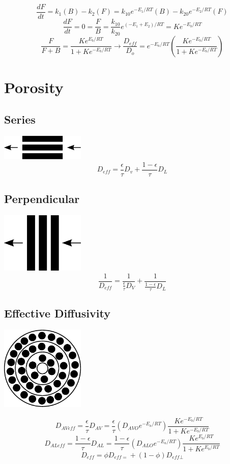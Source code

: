 \documentclass[11pt]{article}
\begin{document}
\[ \frac{dF}{dt} = k_1(B) - k_2(F) = k_{10} e^{-E_1/RT}(B) - k_{20} e^{-E_2/RT}(F) \]
\[ \frac{dF}{dt} = 0 = \frac{F}{B} = \frac{k_{10}}{k_{20}} e^{(-E_1 + E_2)/RT} = Ke^{-E_b/RT} \]
\[ \frac{F}{F+B} = \frac{Ke^{E_b/RT}}{1+Ke^{-E_b/RT}} \rightarrow
\frac{D_{eff}}{D_o} = e^{-E_a/RT}\left(\frac{Ke^{-E_b/RT}}{1+Ke^{-E_b/RT}}\right) \]

\section{Porosity}
\subsection{Series}
\includegraphics[width=0.3\textwidth]{pics/eps/porosity_series}
\[ D_{eff} = \frac{\epsilon}{\tau} D_v + \frac{1-\epsilon}{\tau} D_L \]
\subsection{Perpendicular}
\includegraphics[width=0.3\textwidth]{pics/eps/porosity_perpendicular}
\[ \frac{1}{D_{eff}} = \frac{1}{\frac{\epsilon}{\tau}D_V} + \frac{1}{\frac{1-\epsilon}{\tau} D_L} \]

\subsection{Effective Diffusivity}
\includegraphics[width=0.3\textwidth]{pics/eps/porosity_circular}

\[ D_{AVeff} = \frac{\epsilon}{\tau} D_{AV} = \frac{\epsilon}{\tau} (D_{AVO}e^{-E_a/RT}) \frac{Ke^{-E_b/RT}}{1+Ke^{-E_b/RT}} \]
\[ D_{ALeff} = \frac{1-\epsilon}{\tau} D_{AL} = \frac{1-\epsilon}{\tau} (D_{ALO} e^{-E_a/RT}) \frac{Ke^{E_b/RT}}{1+Ke^{E_b/RT}} \]
\[ D_{eff} = \phi D_{eff=} + (1-\phi) D_{eff\bot} \]
\end{document}
